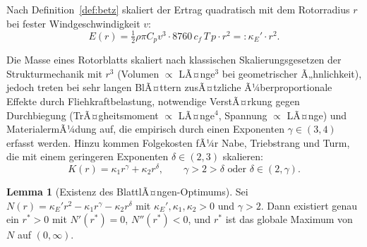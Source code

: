 ﻿\documentclass[a4paper,12pt]{article}
\theoremstyle{definition}
\newtheorem{lemma}{Lemma}
\begin{document}
Nach Definition~\ref{def:betz} skaliert der Ertrag quadratisch mit dem Rotorradius $r$ bei fester Windgeschwindigkeit $v$:
\[
E(r) = \tfrac{1}{2}\rho\pi C_p v^3 \cdot 8760\, c_f\, T\, p \cdot r^2 =: \kappa_E' \cdot r^2.
\]

Die Masse eines Rotorblatts skaliert nach klassischen Skalierungsgesetzen der Strukturmechanik mit $r^3$ (Volumen $\propto$ LÃ¤nge$^3$ bei geometrischer Ã„hnlichkeit), jedoch treten bei sehr langen BlÃ¤ttern zusÃ¤tzliche Ã¼berproportionale Effekte durch Fliehkraftbelastung, notwendige VerstÃ¤rkung gegen Durchbiegung (TrÃ¤gheitsmoment $\propto$ LÃ¤nge$^4$, Spannung $\propto$ LÃ¤nge) und MaterialermÃ¼dung auf, die empirisch durch einen Exponenten $\gamma \in (3, 4)$ erfasst werden. Hinzu kommen Folgekosten fÃ¼r Nabe, Triebstrang und Turm, die mit einem geringeren Exponenten $\delta \in (2,3)$ skalieren:
\[
K(r) = \kappa_1 r^{\gamma} + \kappa_2 r^{\delta}, \qquad \gamma > 2 > \delta \text{ oder } \delta \in (2,\gamma).
\]

\begin{lemma}[Existenz des BlattlÃ¤ngen-Optimums]
\label{lem:blatt_existenz}
Sei $N(r) = \kappa_E' r^2 - \kappa_1 r^{\gamma} - \kappa_2 r^{\delta}$ mit $\kappa_E', \kappa_1, \kappa_2>0$ und $\gamma>2$. Dann existiert genau ein $r^*>0$ mit $N'(r^*)=0$, $N''(r^*)<0$, und $r^*$ ist das globale Maximum von $N$ auf $(0,\infty)$.
\end{lemma}
\end{document}
